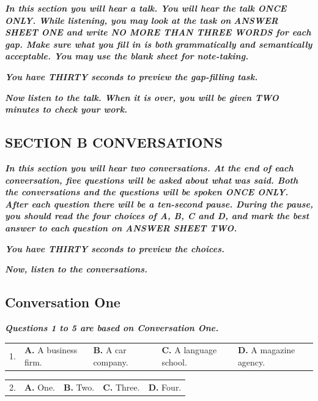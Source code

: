 \documentclass[UTF8,11pt]{ctexart}
\begin{document}
\textbf{\textit{In this section you will hear a talk. You will hear the talk ONCE ONLY. While listening, you may look at the task on}} \textbf{\textit{ANSWER SHEET ONE and write NO MORE THAN THREE WORDS for each gap. Make sure what you fill in is both}} \textbf{\textit{grammatically and semantically acceptable. You may use the blank sheet for note-taking.}}


\textbf{\textit{You have THIRTY seconds to preview the gap-filling task.}}


\textbf{\textit{Now listen to the talk. When it is over, you will be given TWO minutes to check your work.}}


\subsection*{\textbf{SECTION B CONVERSATIONS}}


\textbf{\textit{In this section you will hear two conversations. At the end of each conversation, five questions will be asked about what}} \textbf{\textit{was said. Both the conversations and the questions will be spoken ONCE ONLY. After each question there will be a ten-second pause. During the pause, you should read the four choices of A, B, C and D, and mark the best answer to each}} \textbf{\textit{question on ANSWER SHEET TWO.}}


\textbf{\textit{You have THIRTY seconds to preview the choices.}}


\textbf{\textit{Now, listen to the conversations.}}


\subsection*{\textbf{Conversation One}}


\textbf{\textit{Questions 1 to 5 are based on Conversation One.}}


\noindent\begin{tabularx}{\linewidth}{@{}lXXXX@{}}1. & \textbf{A.} A business firm. & \textbf{B.} A car company. & \textbf{C.} A language school. & \textbf{D.} A magazine agency.\\\end{tabularx}\par

\noindent\begin{tabularx}{\linewidth}{@{}lXXXX@{}}2. & \textbf{A.} One. & \textbf{B.} Two. & \textbf{C.} Three. & \textbf{D.} Four.\\\end{tabularx}\par
\end{document}
